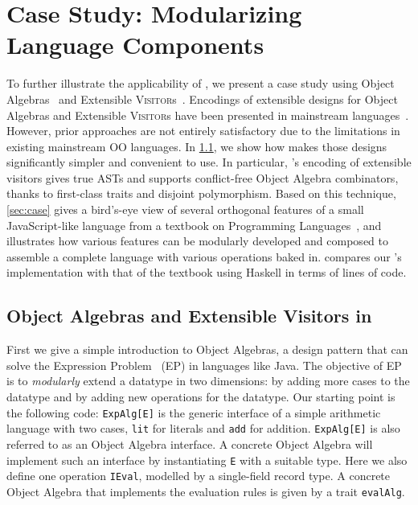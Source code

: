 
\chapter{Case Study: Modularizing Language Components}
\label{chap:case_study}

To further illustrate the applicability of \sedel, we present a case
study using Object Algebras~\cite{oliveira2012extensibility} and
Extensible \textsc{Visitor}s~\cite{oliveira09modular, togersen:2004}. Encodings
of extensible designs for Object Algebras and Extensible \textsc{Visitor}s have
been presented in mainstream languages~\cite{oliveira09modular, togersen:2004, oliveira2012extensibility, oliveira2013feature, rendel14attributes}.
However, prior approaches are not entirely satisfactory
due to the limitations in existing mainstream OO languages. In \cref{sec:ob}, we show how \sedel makes those designs significantly simpler and
convenient to use. In particular, \sedel's encoding of extensible visitors gives true ASTs and supports
conflict-free Object Algebra combinators, thanks to first-class traits and disjoint polymorphism.
Based on this technique, \cref{sec:case} gives a bird's-eye view of several orthogonal features of
a small JavaScript-like language from a textbook on Programming
Languages~\cite{poplcook}, and illustrates how various features can
be modularly developed and composed to assemble a complete language with various
operations baked in.  compares our \sedel's implementation
with that of the textbook using Haskell in terms of lines of code.


\section{Object Algebras and Extensible Visitors in \sedel}
\label{sec:ob}

First we give a simple introduction to Object Algebras, a design pattern that
can solve the Expression Problem~\cite{wadler1998expression} (EP) in languages like
Java. The objective of EP is to \emph{modularly} extend a datatype in two
dimensions: by adding more cases to the datatype and by adding new operations
for the datatype.
Our starting point is the following code:
\lstinline{ExpAlg[E]} is the generic interface of a simple arithmetic language
with two cases, \lstinline{lit} for literals and \lstinline{add} for addition.
\lstinline{ExpAlg[E]} is also referred to as an Object Algebra interface. A concrete
Object Algebra will implement such an interface by instantiating \lstinline{E}
with a suitable type. Here we also define one operation \lstinline{IEval},
modelled by a single-field record type. A concrete Object Algebra that
implements the evaluation rules is given by a trait
\lstinline{evalAlg}.

